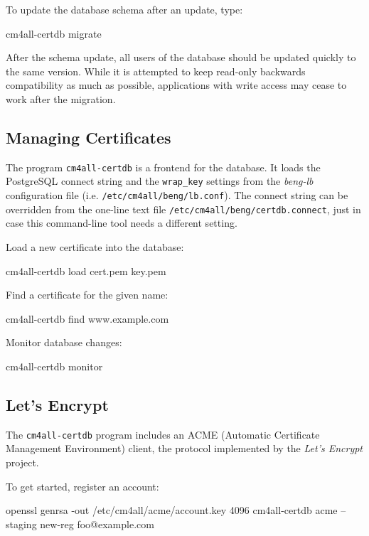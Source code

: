 \documentclass[a4paper,12pt]{article}
\begin{document}
To update the database schema after an update, type:

\begin{verbatim*}
cm4all-certdb migrate
\end{verbatim*}

After the schema update, all users of the database should be updated
quickly to the same version.  While it is attempted to keep read-only
backwards compatibility as much as possible, applications with write
access may cease to work after the migration.

\subsection{Managing Certificates}

The program \texttt{cm4all-certdb} is a frontend for the database.  It
loads the PostgreSQL connect string and the \verb|wrap_key| settings
from the \emph{beng-lb} configuration file
(i.e. \texttt{/etc/cm4all/beng/lb.conf}).  The connect string can be
overridden from the one-line text file
\texttt{/etc/cm4all/beng/certdb.connect}, just in case this
command-line tool needs a different setting.

Load a new certificate into the database:

\begin{verbatim*}
cm4all-certdb load cert.pem key.pem
\end{verbatim*}

Find a certificate for the given name:

\begin{verbatim*}
cm4all-certdb find www.example.com
\end{verbatim*}

Monitor database changes:

\begin{verbatim*}
cm4all-certdb monitor
\end{verbatim*}

\subsection{Let's Encrypt}

The \texttt{cm4all-certdb} program includes an ACME (Automatic
Certificate Management Environment) client, the protocol implemented
by the \emph{Let's Encrypt} project.

To get started, register an account:

\begin{verbatim*}
openssl genrsa -out /etc/cm4all/acme/account.key  4096
cm4all-certdb acme --staging new-reg foo@example.com
\end{verbatim*}
\end{document}
